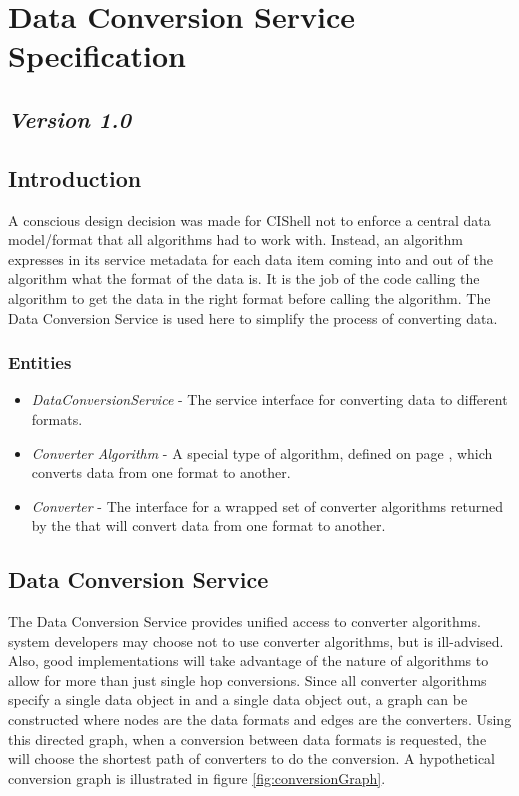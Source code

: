 \chapter{Data Conversion Service Specification}
\section*{\textit{Version 1.0}}
\section{Introduction}

A conscious design decision was made for CIShell not to enforce a central data
model/format that all algorithms had to work with. Instead, an algorithm
expresses in its service metadata for each data item coming into and out of the
algorithm what the format of the data is. It is the job of the code calling the
algorithm to get the data in the right format before calling the algorithm. The
Data Conversion Service is used here to simplify the process of converting data.

\subsection{Entities}

\begin{itemize}
  \item \textit{DataConversionService} - The service interface for converting
  data to different formats.
  \item \textit{Converter Algorithm} - A special type of algorithm, defined
  on page \pageref{converterAlg}, which converts data from one format to
  another.
  \item \textit{Converter} - The interface for a wrapped set of converter
  algorithms returned by the  that will convert
  data from one format to another.
\end{itemize}

\section{Data Conversion Service}

The Data Conversion Service provides unified access to converter algorithms.
 system developers may choose not to use converter
algorithms, but is ill-advised. Also, good implementations will take advantage of
the nature of algorithms to allow for more than just single hop conversions.
Since all converter algorithms specify a single data object in and a single data
object out, a graph can be constructed where nodes are the data formats and edges
are the converters. Using this directed graph, when a conversion between data
formats is requested, the  will choose the shortest
path of converters to do the conversion. A hypothetical conversion graph is
illustrated in figure \ref{fig:conversionGraph}.


